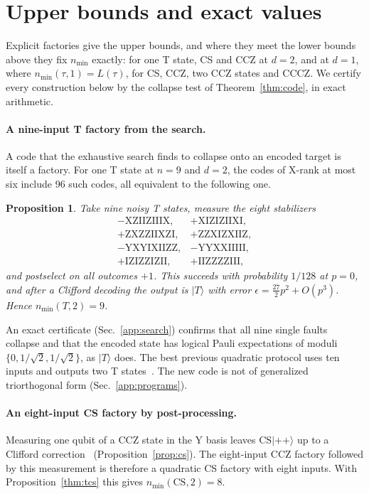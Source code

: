 \documentclass[aps,prl,reprint,twocolumn,amsmath,amssymb,floatfix,nofootinbib,superscriptaddress]{revtex4-2}
\newtheorem{proposition}[theorem]{Proposition}
\newcommand{\CS}{\mathrm{CS}}
\begin{document}
%
\section{Upper bounds and exact values}\label{sec:upper}
Explicit factories give the upper bounds, and where they meet the lower bounds above they fix $n_{\min}$ exactly: for one T state, CS and CCZ at $d=2$, and at $d=1$, where $n_{\min}(\tau,1)=L(\tau)$, for CS, CCZ, two CCZ states and CCCZ. We certify every construction below by the collapse test of Theorem~\ref{thm:code}, in exact arithmetic.

\paragraph*{A nine-input T factory from the search.}
A code that the exhaustive search finds to collapse onto an encoded target is itself a factory. For one T state at $n=9$ and $d=2$, the codes of X-rank at most six include 96 such codes, all equivalent to the following one.
\begin{proposition}\label{prop:t9}
Take nine noisy T states, measure the eight stabilizers
\begin{equation*}
\begin{array}{ll}
-\mathrm{XZIIZIIIX}, & +\mathrm{XIZIZIIXI},\\
+\mathrm{ZXZZIIXZI}, & +\mathrm{ZZXIZXIIZ},\\
-\mathrm{YXYIXIIZZ}, & -\mathrm{YYXXIIIII},\\
+\mathrm{IZIZZIZII}, & +\mathrm{IIZZZZIII},
\end{array}
\end{equation*}
and postselect on all outcomes $+1$. This succeeds with probability $1/128$ at $p=0$, and after a Clifford decoding the output is $|T\rangle$ with error $\epsilon=\tfrac{27}{2}p^2+O(p^3)$. Hence $n_{\min}(T,2)=9$.
\end{proposition}
An exact certificate (Sec.~\ref{app:search}) confirms that all nine single faults collapse and that the encoded state has logical Pauli expectations of moduli $\{0,1/\sqrt2,1/\sqrt2\}$, as $|T\rangle$ does. The best previous quadratic protocol uses ten inputs and outputs two T states~\cite{mek}. The new code is not of generalized triorthogonal form (Sec.~\ref{app:programs}).

\paragraph*{An eight-input CS factory by post-processing.}
Measuring one qubit of a CCZ state in the Y basis leaves $\CS|{+}{+}\rangle$ up to a Clifford correction~\cite[Proposition~A.4]{beverland} (Proposition~\ref{prop:cs}). The eight-input CCZ factory followed by this measurement is therefore a quadratic CS factory with eight inputs. With Proposition~\ref{thm:tcs} this gives $n_{\min}(\CS,2)=8$.
\end{document}
